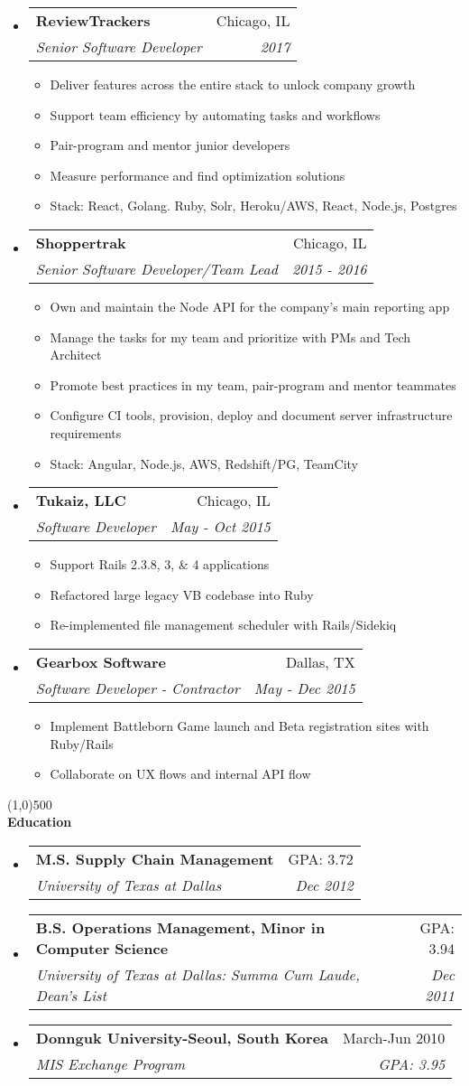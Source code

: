 \documentclass[letterpaper,11pt]{article}
\makeatletter
\newcommand{\resitem}[1]{\item #1 \vspace{-3pt}}
\newcommand{\resheading}[1]{{\large {\textbf{#1 \vphantom{p\^{E}}}}}}
\newcommand{\addline}{\line(1,0){500}}
\newcommand{\ressubheading}[4]{
	\begin{tabular*}{6.5in}{l@{\extracolsep{\fill}}r}
			\textbf{#1} & #2 \\
			\textit{#3} & \textit{#4} \\
	\end{tabular*}\vspace{-6pt}}
\makeatother
\begin{document}
\begin{itemize}
\item
  \ressubheading{ReviewTrackers}{Chicago, IL}{Senior Software Developer}{2017}
	\begin{itemize}
    \resitem{Deliver features across the entire stack to unlock company growth}
    \resitem{Support team efficiency by automating tasks and workflows}
    \resitem{Pair-program and mentor junior developers}
    \resitem{Measure performance and find optimization solutions}
        \resitem{Stack: React, Golang. Ruby, Solr, Heroku/AWS, React, Node.js, Postgres}
	\end{itemize}

\item
  \ressubheading{Shoppertrak}{Chicago, IL}{Senior Software Developer/Team Lead}{2015 - 2016}
	\begin{itemize}
    \resitem{Own and maintain the Node API for the company's main reporting app }
    \resitem{Manage the tasks for my team and prioritize with PMs and Tech Architect}
    \resitem{Promote best practices in my team, pair-program and mentor teammates}
    \resitem{Configure CI tools, provision, deploy and document server infrastructure requirements}
     \resitem{Stack: Angular, Node.js, AWS, Redshift/PG, TeamCity}
	\end{itemize}


\item
	\ressubheading{Tukaiz, LLC}{Chicago, IL}{Software Developer}{May - Oct 2015}
	\begin{itemize}
		\resitem{Support Rails 2.3.8, 3, \& 4 applications }
		\resitem{Refactored large legacy VB codebase into Ruby}
		\resitem{Re-implemented file management scheduler with Rails/Sidekiq}
	\end{itemize}

\item 
	\ressubheading{Gearbox Software}{Dallas, TX}{Software Developer - Contractor}{May - Dec 2015}
	\begin{itemize}
		\resitem{Implement Battleborn Game launch and Beta registration sites with Ruby/Rails}
		\resitem{Collaborate on UX flows and internal API flow}
	\end{itemize}

\end{itemize}
\addline
\\
\resheading{Education}
\begin{itemize}
\item
	\ressubheading{M.S. Supply Chain Management}{GPA: 3.72}
{University of Texas at Dallas}{Dec 2012}

\item
	\ressubheading{B.S. Operations Management, Minor in Computer Science}
		{GPA: 3.94}{University of Texas at Dallas: Summa Cum Laude, Dean's
			List}{Dec 2011}

\item
	\ressubheading{Donnguk University-Seoul, South Korea}{March-Jun 2010}{MIS
		Exchange Program}{GPA: 3.95}
\end{itemize}
\end{document}
